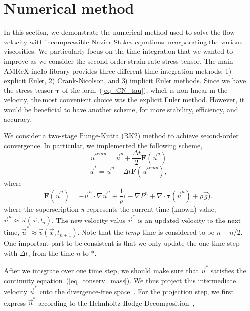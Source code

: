 \section{Numerical method}
In this section, we demonstrate the numerical method used to solve the flow velocity with incompressible Navier-Stokes equations incorporating the various viscosities. We particularly focus on the time integration that we wanted to improve as we consider the second-order strain rate stress tensor.
The main AMReX-incflo library provides three different time integration methods: 1) explicit Euler, 2) Crank-Nicolson, and 3) implicit Euler methods. 
Since we have the stress tensor ${\bm \tau}$ of the form~(\ref{eq_CN_tau}), which is non-linear in the velocity, the most convenient choice was the explicit Euler method.
 However, it would be beneficial to have another scheme, for more stability, efficiency, and accuracy. 
 \par
 We consider a two-stage Runge-Kutta (RK2) method to achieve second-order convergence. 
In particular, we implemented the following scheme,
\begin{equation}
	\vec{u}^{temp} = \vec{u}^{n} + \frac{\Delta t}{2} {\bm F} \left( \vec{u}^{n} \right)
	\label{eq_RK2_s1} 
\end{equation}
\begin{equation}
	\vec{u}^{*} = \vec{u}^{n} + \Delta t {\bm F} \left( \vec{u}^{temp} \right),
	\label{eq_RK2_s2}
\end{equation}
where 
\[
  {\bm F} \left( \vec{u}^{n} \right)= 
    -\vec{u}^n \cdot \nabla \vec{u}^n 
    +\frac{1}{\rho}
    \biggl(
    - \nabla P^n 
        + \nabla \cdot   \bm{\tau}(\vec{u}^n)
        +  \rho  \vec{g} 
        \biggr).
\]
where the superscription $n$ represents the current time (known) value; $\vec{u}^n \approx \vec{u}(\vec{x}, t_n)$. The new velocity value $\vec{u}^*$ is an updated velocity to the next time, $\vec{u}^*  \approx \vec{u} (\vec{x}, t_{n+1})$. 
Note that the \textit{temp} time is considered to be $ n + n$/2. One important part to be consistent is that we only update the one time step with $\Delta t$, from the time $n$ to $*$. 
\par
After we integrate over one time step, we should make sure that $\vec{u}^*$ satisfies the continuity equation~(\ref{eq_conserv_mass}). We thus project this intermediate velocity $\vec{u}^*$ onto the divergence-free space~\cite{sverdrup_highly_2018}.
For the projection step, we first express $\vec{u}^{*}$ according to the Helmholtz-Hodge-Decomposition~\cite{chorin_mathematical_1993}, 
